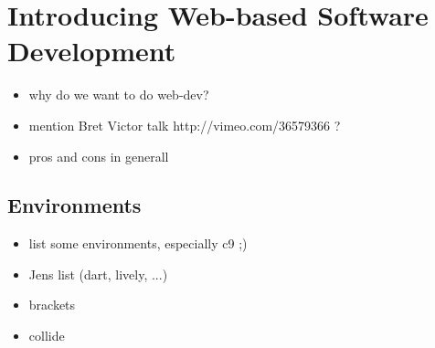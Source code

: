 \section{Introducing Web-based Software Development}
\label{sec:Introduction}

\begin{itemize}
	\item why do we want to do web-dev?
	\item mention Bret Victor talk http://vimeo.com/36579366 ?
	\item pros and cons in generall
\end{itemize}

\subsection{Environments}
\begin{itemize}
	\item list some environments, especially c9 ;)
	\item Jens list (dart, lively, ...)
	\item brackets
	\item collide
\end{itemize}